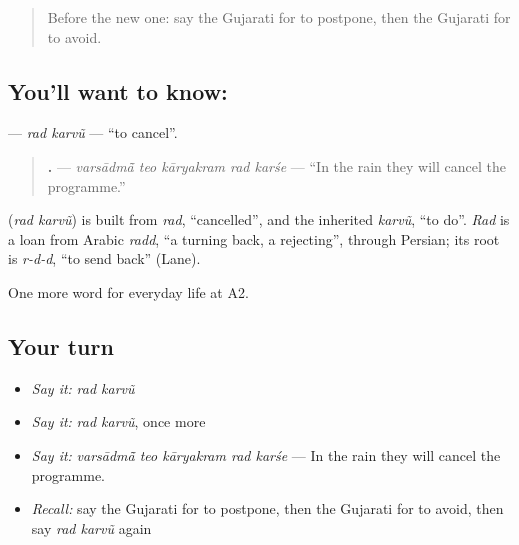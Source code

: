 \label{lesson:GU-C181-rad-karvu}



\begin{quote}
Before the new one: say the Gujarati for to postpone, then the Gujarati for to avoid.
\end{quote}

\subsection*{You'll want to know:  }
\textbf{ } — \emph{rad karvũ} — \textquotedblleft{}to cancel\textquotedblright{}.

\begin{quote}
\textbf{    .} — \emph{varsādmā̃ teo kāryakram rad karśe} — \textquotedblleft{}In the rain they will cancel the programme.\textquotedblright{}
\end{quote}

\begin{cousinweb}
\textbf{ } (\emph{rad karvũ}) is built from \emph{rad}, \textquotedblleft{}cancelled\textquotedblright{}, and the inherited \emph{karvũ}, \textquotedblleft{}to do\textquotedblright{}. \emph{Rad} is a loan from Arabic \emph{radd}, \textquotedblleft{}a turning back, a rejecting\textquotedblright{}, through Persian; its root is \emph{r-d-d}, \textquotedblleft{}to send back\textquotedblright{} (Lane).
\end{cousinweb}

\begin{grammarlens}[title={What you've built}]
One more word for everyday life at A2.
\end{grammarlens}

\subsection*{Your turn}
\begin{itemize}
\raggedright
  \item \emph{Say it:} \emph{rad karvũ}
  \item \emph{Say it:} \emph{rad karvũ}, once more
  \item \emph{Say it:} \emph{varsādmā̃ teo kāryakram rad karśe} — In the rain they will cancel the programme.
  \item \emph{Recall:} say the Gujarati for to postpone, then the Gujarati for to avoid, then say \emph{rad karvũ} again
\end{itemize}

